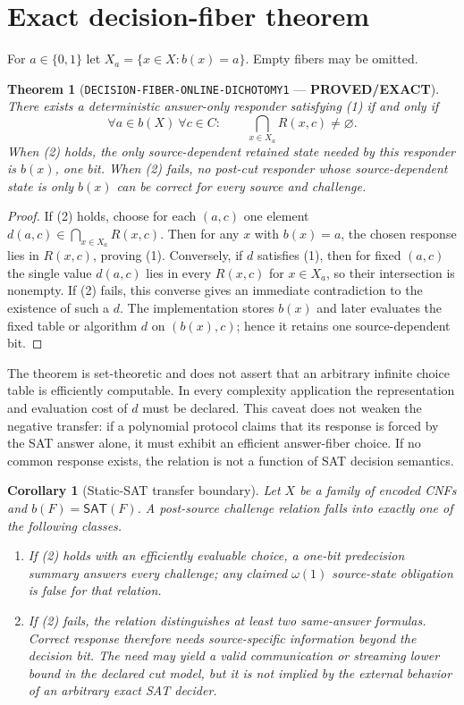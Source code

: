 \documentclass[11pt]{article}
\newtheorem{theorem}{Theorem}
\newtheorem{corollary}{Corollary}
\newcommand{\SAT}{\mathsf{SAT}}
\newcommand{\EXACT}{\textbf{PROVED/EXACT}}
\begin{document}
\section{Exact decision-fiber theorem}

For $a\in\{0,1\}$ let $X_a=\{x\in X:b(x)=a\}$.  Empty fibers may be omitted.

\begin{theorem}[\texttt{DECISION-FIBER-ONLINE-DICHOTOMY1} --- \EXACT]
There exists a deterministic answer-only responder satisfying (1) if and only
if
\[
 \forall a\in b(X)\ \forall c\in C:\qquad
 \bigcap_{x\in X_a}R(x,c)\ne\varnothing.
 \tag{2}
\]
When (2) holds, the only source-dependent retained state needed by this
responder is $b(x)$, one bit.  When (2) fails, no post-cut responder whose
source-dependent state is only $b(x)$ can be correct for every source and
challenge.
\end{theorem}

\begin{proof}
If (2) holds, choose for each $(a,c)$ one element
$d(a,c)\in\bigcap_{x\in X_a}R(x,c)$.  Then for any $x$ with $b(x)=a$, the
chosen response lies in $R(x,c)$, proving (1).  Conversely, if $d$ satisfies
(1), then for fixed $(a,c)$ the single value $d(a,c)$ lies in every
$R(x,c)$ for $x\in X_a$, so their intersection is nonempty.  If (2) fails,
this converse gives an immediate contradiction to the existence of such a
$d$.  The implementation stores $b(x)$ and later evaluates the fixed table or
algorithm $d$ on $(b(x),c)$; hence it retains one source-dependent bit.
\end{proof}

The theorem is set-theoretic and does not assert that an arbitrary infinite
choice table is efficiently computable.  In every complexity application the
representation and evaluation cost of $d$ must be declared.  This caveat does
not weaken the negative transfer: if a polynomial protocol claims that its
response is forced by the SAT answer alone, it must exhibit an efficient
answer-fiber choice.  If no common response exists, the relation is not a
function of SAT decision semantics.

\begin{corollary}[Static-SAT transfer boundary]
Let $X$ be a family of encoded CNFs and $b(F)=\SAT(F)$.  A post-source
challenge relation falls into exactly one of the following classes.
\begin{enumerate}[label=(\roman*),leftmargin=2em]
\item If (2) holds with an efficiently evaluable choice, a one-bit
predecision summary answers every challenge; any claimed
$\omega(1)$ source-state obligation is false for that relation.
\item If (2) fails, the relation distinguishes at least two same-answer
formulas.  Correct response therefore needs source-specific information
beyond the decision bit.  The need may yield a valid communication or
streaming lower bound in the declared cut model, but it is not implied by the
external behavior of an arbitrary exact SAT decider.
\end{enumerate}
\end{corollary}
\end{document}
